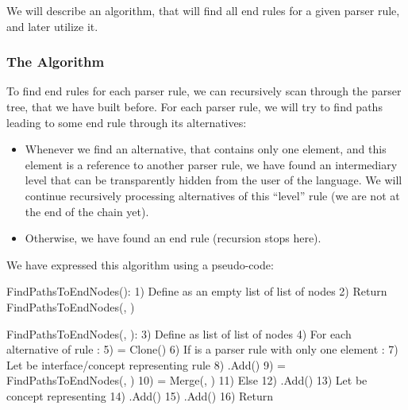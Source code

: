 We will describe an algorithm, that will find all end rules for a given parser rule, and later utilize it.

\subsubsection{The Algorithm}
To find end rules for each parser rule, we can recursively scan through the parser tree, that we have built before.
For each parser rule, we will try to find paths leading to some end rule through its alternatives:

\begin{itemize}
	\item Whenever we find an alternative, that contains only one element, and this element is a reference to another parser rule, we have found an intermediary level that can be transparently hidden from the user of the language.
	We will continue recursively processing alternatives of this “level” rule (we are not at the end of the chain yet).

	\item Otherwise, we have found an end rule (recursion stops here).
\end{itemize}

We have expressed this algorithm using a pseudo-code:

\label{chap:shortcut_algorithm}
\begin{antlr}
	FindPathsToEndNodes():
	1)  Define  as an empty list of list of nodes
	2)  Return FindPathsToEndNodes(, )

	FindPathsToEndNodes(, ):
	3)  Define  as list of list of nodes
	4)  For each alternative  of rule :
	5)       = Clone()
	6)      If  is a parser rule with only one element :
	7)          Let  be interface/concept representing rule 
	8)          .Add()
	9)           = FindPathsToEndNodes(, )
	10)          = Merge(, )
	11)     Else
	12)         .Add()
	13)         Let  be concept representing 
	14)         .Add()
	15)         .Add()
	16) Return 
\end{antlr}

